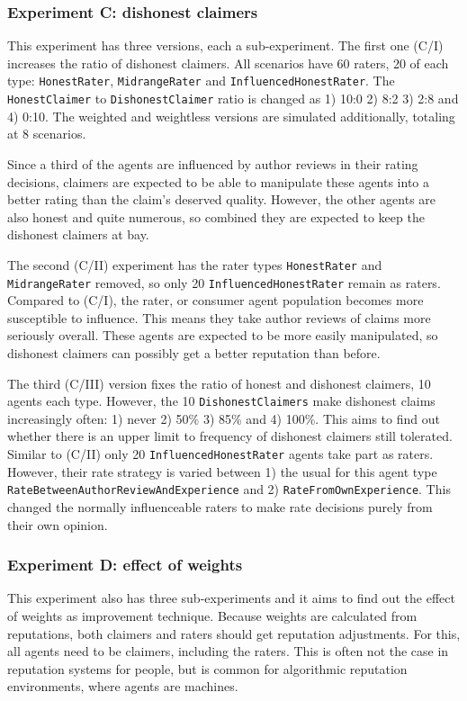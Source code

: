 \documentclass[%
    ]{\PathToTumTemplate/thesis/tum_thesis}
\begin{document}
\subsubsection{Experiment C: dishonest claimers}
This experiment has three versions, each a sub-experiment.
The first one (C/I) increases the ratio of dishonest claimers.
All scenarios have 60 raters, 20 of each type: \texttt{HonestRater}, \texttt{MidrangeRater} and \texttt{InfluencedHonestRater}.
The \texttt{HonestClaimer} to \texttt{DishonestClaimer} ratio is changed as 1) 10:0 2) 8:2 3) 2:8 and 4) 0:10.
The weighted and weightless versions are simulated additionally, totaling at 8 scenarios.

Since a third of the agents are influenced by author reviews in their rating decisions, claimers are expected to be able to manipulate these agents into a better rating than the claim's deserved quality.
However, the other agents are also honest and quite numerous, so combined they are expected to keep the dishonest claimers at bay.

The second (C/II) experiment has the rater types \texttt{HonestRater} and \texttt{MidrangeRater} removed, so only 20 \texttt{InfluencedHonestRater} remain as raters.
Compared to (C/I), the rater, or consumer agent population becomes more susceptible to influence.
This means they take author reviews of claims more seriously overall.
These agents are expected to be more easily manipulated, so dishonest claimers can possibly get a better reputation than before.

The third (C/III) version fixes the ratio of honest and dishonest claimers, 10 agents each type.
However, the 10 \texttt{DishonestClaimers} make dishonest claims increasingly often: 1) never 2) 50\% 3) 85\% and 4) 100\%.
This aims to find out whether there is an upper limit to frequency of dishonest claimers still tolerated.
Similar to (C/II) only 20 \texttt{InfluencedHonestRater} agents take part as raters.
However, their rate strategy is varied between 1) the usual for this agent type \texttt{RateBetweenAuthorReviewAndExperience} and 2) \texttt{RateFromOwnExperience}.
This changed the normally influenceable raters to make rate decisions purely from their own opinion.

\subsubsection{Experiment D: effect of weights}
This experiment also has three sub-experiments and it aims to find out the effect of weights as improvement technique.
Because weights are calculated from reputations, both claimers and raters should get reputation adjustments.
For this, all agents need to be claimers, including the raters.
This is often not the case in reputation systems for people, but is common for algorithmic reputation environments, where agents are machines.
\end{document}
